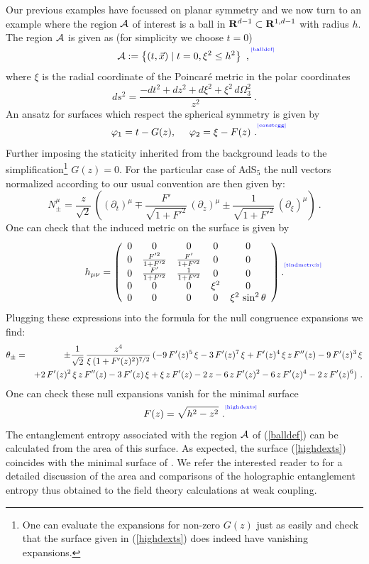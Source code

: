 \documentclass[12pt]{article}
\newcommand{\be}{\begin{equation}}
\newcommand{\ee}{\end{equation}}
\def\req#1{(\ref{#1})}
\def\({\left (}
\def\){\right )}
\def\vp{\varphi}
\def\p{\partial}
\def\s{\sigma}
\def\CA{{\cal A}}
\def\R{{\bf R}}
\def\p{\partial}
\def\f#1#2{{\frac{#1}{#2}}}
\def\f#1#2{{\frac{#1}{#2}}}
\def\p{\partial}
\def\Label#1{\label{#1}%
{ \color{blue}{\smash{\hbox to0pt{\raise2ex\hbox{\tiny[#1]}\hss}}}}}
\def\rA{\CA}
\def\ads#1{AdS$_{#1}$}
\def\s{\sqrt}
\def\f {\frac}
\def\no{\nonumber \\}
\def\vp{\varphi}
\def\ba{\begin{eqnarray}}
\def\ea{\end{eqnarray}}
\begin{document}
Our previous examples have focussed on planar symmetry and we now
turn to an example where the region $\rA$ of interest is a ball in
$\R^{d-1} \subset \R^{1,d-1}$ with radius $h$. The region $\rA$ is
given as (for simplicity we choose $t=0$)
%
\begin{equation}
\rA := \left\{ (t,\vec{x} ) \mid t = 0 , \xi^2 \le h^2 \right\} \ ,
\Label{balldef}
\end{equation}
%
where $\xi$ is the radial
coordinate of the Poincar\'e metric in the polar coordinates
%
\be
ds^2=\f{-dt^2+dz^2+d\xi^2+\xi^2 \, d\Omega_{3}^2}{z^2} \ . \ee
%
An ansatz for surfaces which respect the spherical symmetry is given by
%
 \be \vp_1=t-G(z),\ \ \ \
\vp_2=\xi-F(z)\ . \Label{constcgg} \ee
%
Further imposing the staticity inherited from the background
leads to the simplification\footnote{One can evaluate the
expansions  for non-zero $G(z)$ just as easily and check that the
surface given in \req{highdexts} does indeed have vanishing
expansions.} $G(z)=0$. For the particular case of \ads{5} the null
vectors normalized according to our usual convention are then given
by:
%
\begin{equation}
 N_{\pm}^\mu =\f{z}{\s{2}}\, \( \(\p_t\)^\mu \mp \f{F'}{\s{1+F'^2}}\, \(\p_z\)^\mu \pm
 \f{1}{\s{1+F'^2}} \, \(\p_\xi\)^\mu \) \ .
\end{equation}
%
One can check that  the induced metric on the surface is given by
%
\begin{equation}
h_{\mu\nu}=\left(\begin{array}{ccccc}
  0 & 0 & 0 & 0 &0\\
  0 & \f{F'^2}{1+F'^2} & \f{F'}{1+F'^2} & 0 & 0\\
  0 & \f{F'}{1+F'^2} & \f{1}{1+F'^2} & 0 & 0\\
  0 & 0 & 0 & \xi^2 & 0 \\
  0 & 0 & 0 & 0 & \xi^2 \, \sin^2\theta
\end{array}\right).
\Label{tindmetrcir}
\end{equation}
%
Plugging these expressions  into the formula for the null congruence expansions we find:
%
\ba \theta_{\pm} &=& \pm {1\over \sqrt{2}} \, {z^4   \over \xi \,
(1+F'(z)^2)^{7/2}} \, (- 9 \, F'(z)^5 \, \xi - 3 \, F'(z)^7\, \xi +
F'(z)^4\, \xi \, z \, F''(z) - 9 \,F'(z)^3\, \xi \no & &
 + 2 \, F'(z)^2 \, \xi \, z \, F''(z) - 3 \,F'(z)\,
  \xi  + \xi \,z \,F'(z) -2 \,z - 6\, z \,F'(z)^2 -6 \,z\, F'(z)^4 - 2
  \,z\,F'(z)^6) \ . \no\ea
%
One can check these null expansions vanish for the minimal surface
%
\be F(z) = \sqrt{h^2-z^2}\ . \Label{highdexts}\ee
%
The entanglement entropy  associated with the region $\rA$ of \req{balldef} can be calculated from the area of this surface. As expected, the surface  \req{highdexts} coincides with the minimal surface of \cite{Ryu:2006ef}. We refer the interested reader to \cite{Ryu:2006ef} for a detailed discussion of the area and comparisons of the holographic entanglement entropy thus obtained to the field theory calculations at weak coupling.
\end{document}
